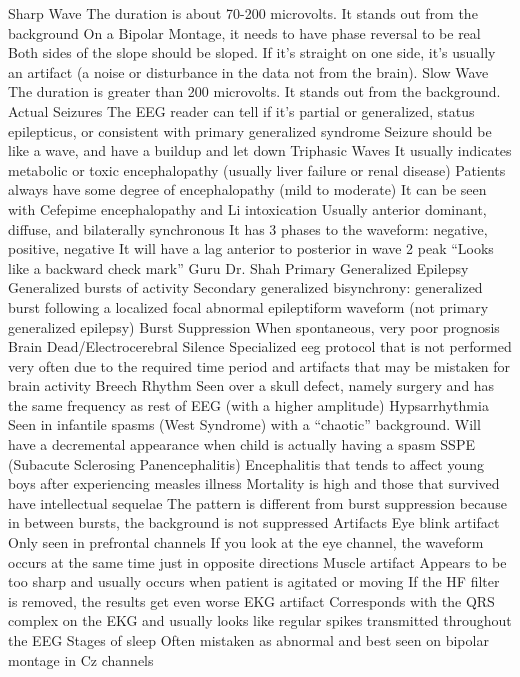 \documentclass[12pt]{article}
\begin{document}
Sharp Wave
The duration is about 70-200 microvolts.
It stands out from the background
On a Bipolar Montage, it needs to have phase reversal to be real
Both sides of the slope should be sloped. If it’s straight on one side, it’s usually an artifact (a noise or disturbance in the data not from the brain).
 Slow Wave
The duration is greater than 200 microvolts.
It stands out from the background.
Actual Seizures
The EEG reader can tell if it’s partial or generalized, status epilepticus, or consistent with primary generalized syndrome 
Seizure should be like a wave, and have a buildup and let down
Triphasic Waves
It usually indicates metabolic or toxic encephalopathy (usually liver failure or renal disease)
Patients always have some degree of encephalopathy (mild to moderate)
It can be seen with Cefepime encephalopathy and Li intoxication 
Usually anterior dominant, diffuse, and bilaterally synchronous 
It has 3 phases to the waveform: negative, positive, negative
It will have a lag anterior to posterior in wave 2 peak
“Looks like a backward check mark” Guru Dr. Shah
Primary Generalized Epilepsy 
Generalized bursts of activity 
Secondary generalized bisynchrony: generalized burst following a localized focal abnormal epileptiform waveform (not primary generalized epilepsy)
Burst Suppression 
When spontaneous, very poor prognosis
Brain Dead/Electrocerebral Silence
Specialized eeg protocol that is not performed very often due to the required time period and artifacts that may be mistaken for brain activity
Breech Rhythm
Seen over a skull defect, namely surgery and has the same frequency as rest of EEG (with a higher amplitude)
Hypsarrhythmia
Seen in infantile spasms (West Syndrome) with a “chaotic” background.
Will have a decremental appearance when child is actually having a spasm 
SSPE (Subacute Sclerosing Panencephalitis)
Encephalitis that tends to affect young boys after experiencing measles illness
Mortality is high and those that survived have intellectual sequelae 
The pattern is different from burst suppression because in between bursts, the background is not suppressed
Artifacts
Eye blink artifact
Only seen in prefrontal channels
If you look at the eye channel, the waveform occurs at the same time just in opposite directions
Muscle artifact 
Appears to be too sharp and usually occurs when patient is agitated or moving
If the HF filter is removed, the results get even worse
EKG artifact 
Corresponds with the QRS complex on the EKG and usually looks like regular spikes transmitted throughout the EEG
Stages of sleep
Often mistaken as abnormal and best seen on bipolar montage in Cz channels
\end{document}
